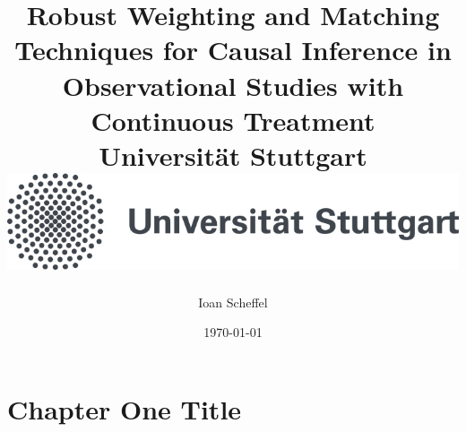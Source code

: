 \documentclass[12pt]{report}
\title{
{Robust Weighting and Matching Techniques for Causal Inference in Observational Studies with Continuous Treatment}\\
{\large Universität Stuttgart}\\
{\includegraphics{unistuttgart_logo_deutsch.jpg}}
}
\author{Ioan Scheffel}
\date{\today}
\begin{document}
\maketitle 

\chapter{Chapter One Title}


    
\end{document}

